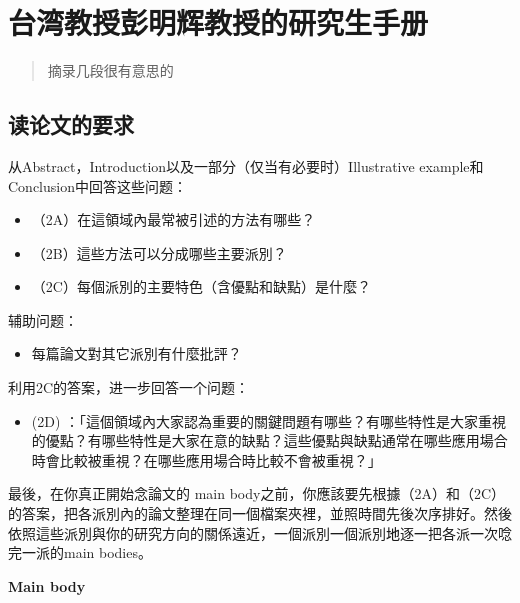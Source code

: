 \documentclass[
]{book}
\providecommand{\tightlist}{%
  \setlength{\itemsep}{0pt}\setlength{\parskip}{0pt}}
\theoremstyle{definition}
\theoremstyle{definition}
\theoremstyle{definition}
\theoremstyle{remark}
\begin{document}
\hypertarget{ux53f0ux6e7eux6559ux6388ux5f6dux660eux8f89ux6559ux6388ux7684ux7814ux7a76ux751fux624bux518c}{%
\section{台湾教授彭明辉教授的研究生手册}\label{ux53f0ux6e7eux6559ux6388ux5f6dux660eux8f89ux6559ux6388ux7684ux7814ux7a76ux751fux624bux518c}}

\begin{quote}
摘录几段很有意思的
\end{quote}

\hypertarget{ux8bfbux8bbaux6587ux7684ux8981ux6c42}{%
\subsection{读论文的要求}\label{ux8bfbux8bbaux6587ux7684ux8981ux6c42}}

从Abstract，Introduction以及一部分（仅当有必要时）Illustrative example和Conclusion中回答这些问题：

\begin{itemize}
\tightlist
\item
  （2A）在這領域內最常被引述的方法有哪些？
\item
  （2B）這些方法可以分成哪些主要派別？
\item
  （2C）每個派別的主要特色（含優點和缺點）是什麼？
\end{itemize}

辅助问题：

\begin{itemize}
\tightlist
\item
  每篇論文對其它派別有什麼批評？
\end{itemize}

利用2C的答案，进一步回答一个问题：

\begin{itemize}
\tightlist
\item
  (2D) ：「這個領域內大家認為重要的關鍵問題有哪些？有哪些特性是大家重視的優點？有哪些特性是大家在意的缺點？這些優點與缺點通常在哪些應用場合時會比較被重視？在哪些應用場合時比較不會被重視？」
\end{itemize}

最後，在你真正開始念論文的 main body之前，你應該要先根據（2A）和（2C）的答案，把各派別內的論文整理在同㆒個檔案夾裡，並照時間先後次序排好。然後依照這些派別與你的研究方向的關係遠近，㆒個派別㆒個派別㆞逐㆒把各派㆒次唸完㆒派的main bodies。

\textbf{Main body}
\end{document}
